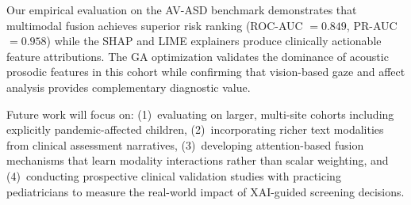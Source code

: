 \documentclass[conference]{IEEEtran}
\begin{document}
Our empirical evaluation on the AV-ASD benchmark demonstrates that multimodal fusion achieves superior risk ranking (ROC-AUC $= 0.849$, PR-AUC $= 0.958$) while the SHAP and LIME explainers produce clinically actionable feature attributions. The GA optimization validates the dominance of acoustic prosodic features in this cohort while confirming that vision-based gaze and affect analysis provides complementary diagnostic value.

Future work will focus on: (1)~evaluating on larger, multi-site cohorts including explicitly pandemic-affected children, (2)~incorporating richer text modalities from clinical assessment narratives, (3)~developing attention-based fusion mechanisms that learn modality interactions rather than scalar weighting, and (4)~conducting prospective clinical validation studies with practicing pediatricians to measure the real-world impact of XAI-guided screening decisions.


\end{document}
